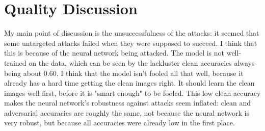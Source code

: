 \documentclass{article}
\begin{document}
\section{Quality Discussion}
My main point of discussion is the unsuccessfulness of the attacks: it seemed that some untargeted attacks failed when they were supposed to succeed.
I think that this is because of the neural network being attacked.
The model is not well-trained on the data, which can be seen by the lackluster clean accuracies always being about 0.60.
I think that the model isn't fooled all that well, because it already has a hard time getting the clean images right.
It should learn the clean images well first, before it is "smart enough" to be fooled.
This low clean accuracy makes the neural network's robustness against attacks seem inflated: clean and adversarial accuracies are roughly the same, not because the neural network is very robust, but because all accuracies were already low in the first place.
\end{document}
